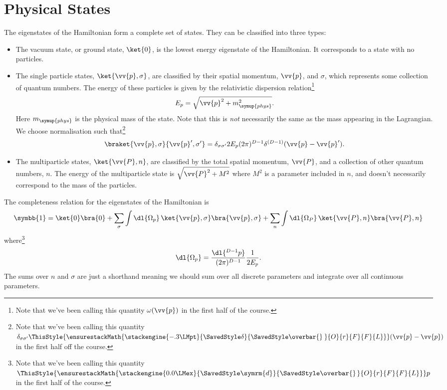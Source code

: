 \documentclass[fleqn]{NotesClass}
\newcommand{\ident}{\symbb{1}}
\newcommand{\dbar}[1][0.0]{\ThisStyle{\ensurestackMath{%
            \stackengine{#1\LMex}{\SavedStyle \symrm{d}}{\SavedStyle\overbar{}%
                \mkern2.25mu}{O}{r}{F}{F}{L}}}}
\newcommand{\invariantmeasure}[1]{%
    \mathchoice{\dbar #1}{\dbar #1}{\dbar[.05] #1}{\dbar[.06] #1}
}
\newcommand\bardelta{\ThisStyle{\ensurestackMath{%
            \stackengine{-.3\LMpt}{\SavedStyle \delta}{\SavedStyle\overbar{}%
                \mkern4.5mu}{O}{r}{F}{F}{L}}}}
\newcommand{\phys}{\symup{phys}}
\begin{document}
    \section{Physical States}
    The eigenstates of the Hamiltonian form a complete set of states.
    They can be classified into three types:
    \begin{itemize}
        \item The vacuum state, or ground state, \(\ket{0}\), is the lowest energy eigenstate of the Hamiltonian.
        It corresponds to a state with no particles.
        \item The single particle states, \(\ket{\vv{p}, \sigma}\), are classified by their spatial momentum, \(\vv{p}\), and \(\sigma\), which represents some collection of quantum numbers.
        The energy of these particles is given by the relativistic dispersion relation\footnote{Note that we've been calling this quantity \(\omega(\vv{p})\) in the first half of the course.}
        \begin{equation}
            E_p = \sqrt{\vv{p}^2 + m^2_{\phys}}.
        \end{equation}
        Here \(m_{\phys}\) is the physical mass of the state.
        Note that this is \emph{not} necessarily the same as the mass appearing in the Lagrangian.
        We choose normalisation such that\footnote{Note that we've been calling this quantity \(\delta_{\sigma\sigma'}\bardelta(\vv{p} - \vv{p})\) in the first half off the course.}
        \begin{equation}
            \braket{\vv{p}, \sigma}{\vv{p}', \sigma'} = \delta_{\sigma\sigma'} 2E_p(2\pi)^{D-1}\delta^{(D-1)}(\vv{p} - \vv{p}').
        \end{equation}
        \item The multiparticle states, \(\ket{\vv{P}, n}\), are classified by the total spatial momentum, \(\vv{P}\), and a collection of other quantum numbers, \(n\).
        The energy of the multiparticle state is \(\sqrt{\vv{P}^2 + M^2}\) where \(M^2\) is a parameter included in \(n\), and doesn't necessarily correspond to the mass of the particles.
    \end{itemize}
    
    The completeness relation for the eigenstates of the Hamiltonian is
    \begin{equation}
        \ident = \ket{0} \bra{0} + \sum_\sigma \int \dl{\Omega_p} \, \ket{\vv{p}, \sigma} \bra{\vv{p}, \sigma} + \sum_n \int \dl{\Omega_P} \, \ket{\vv{P}, n} \bra{\vv{P}, n}
    \end{equation}
    where\footnote{Note that we've been calling this quantity \(\invariantmeasure{p}\) in the first half of the course.}
    \begin{equation}
        \dl{\Omega_p} = \frac{\dl{^{D-1}p}}{(2\pi)^{D-1}} \frac{1}{2E_p}.
    \end{equation}
    The sums over \(n\) and \(\sigma\) are just a shorthand meaning we should sum over all discrete parameters and integrate over all continuous parameters.
    
\end{document}
